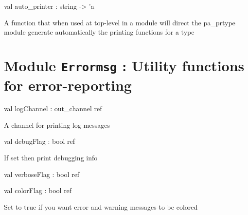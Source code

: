 \documentclass[11pt]{article}
\begin{document}
\label{val:Pretty.auto-underscoreprinter}\begin{ocamldoccode}
val auto_printer : string -> 'a
\end{ocamldoccode}
\begin{ocamldocdescription}
A function that when used at top-level in a module will direct 
 the pa\_prtype module generate automatically the printing functions for a 
 type


\end{ocamldocdescription}


\section{Module {\tt{Errormsg}} : Utility functions for error-reporting}
\label{module:Errormsg}




\ocamldocvspace{0.5cm}



\label{val:Errormsg.logChannel}\begin{ocamldoccode}
val logChannel : out_channel ref
\end{ocamldoccode}
\begin{ocamldocdescription}
A channel for printing log messages


\end{ocamldocdescription}




\label{val:Errormsg.debugFlag}\begin{ocamldoccode}
val debugFlag : bool ref
\end{ocamldoccode}
\begin{ocamldocdescription}
If set then print debugging info


\end{ocamldocdescription}




\label{val:Errormsg.verboseFlag}\begin{ocamldoccode}
val verboseFlag : bool ref
\end{ocamldoccode}




\label{val:Errormsg.colorFlag}\begin{ocamldoccode}
val colorFlag : bool ref
\end{ocamldoccode}
\begin{ocamldocdescription}
Set to true if you want error and warning messages to be colored


\end{ocamldocdescription}
\end{document}

